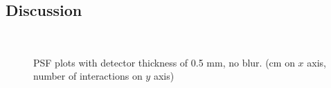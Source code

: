 \documentclass[a4paper]{article}
\begin{document}
\subsection{Discussion}
\begin{figure}[!htb]
  \centering
  \\
  \caption{PSF plots with detector thickness of 0.5 mm, no blur. (cm on $x$ axis, number of interactions on $y$ axis)}
  \label{fig:plots_one}
\end{figure}
\end{document}
